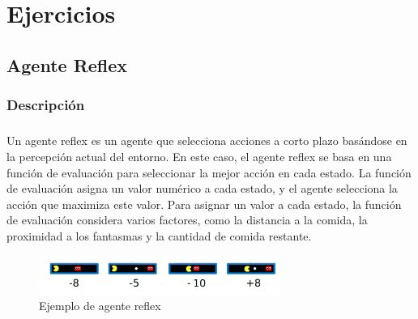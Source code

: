 \documentclass{report}
\begin{document}
    \chapter{Ejercicios}
      \section{Agente Reflex} %
        \subsection*{Descripción}
          \paragraph*{}{
            Un agente reflex es un agente que selecciona acciones a corto plazo basándose en la percepción actual del entorno. 
            En este caso, el agente reflex se basa en una función de evaluación para seleccionar la mejor acción en cada estado. 
            La función de evaluación asigna un valor numérico a cada estado, y el agente selecciona la acción que maximiza este valor.
            Para asignar un valor a cada estado, la función de evaluación considera varios factores, como la distancia a la comida, la proximidad a los fantasmas y la cantidad de comida restante.
            \begin{figure}[H]
                \centering
                \includegraphics[width=0.7\textwidth]{./.img/reflex.png}
                \caption{Ejemplo de agente reflex}
            \end{figure}  
        }
\end{document}
